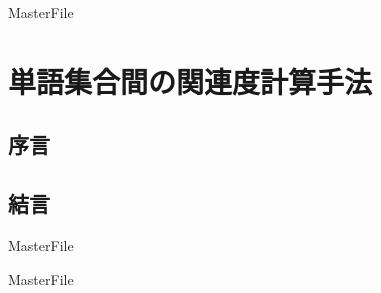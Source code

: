 \expandafter\ifx\csname MasterFile\endcsname\relax
	\def\SubFile{hoge}
	
	
	\setcounter{chapter}{3}
  \fi
  \cleardoublepage
\chapter{単語集合間の関連度計算手法}

\label{impl:chapter}

\section{序言}
\label{impl:introduction}

\section{結言}
\label{impl:conclusion}

 \expandafter\ifx\csname MasterFile\endcsname\relax
	\def\BibFile{hoge}
	
  \fi
  \expandafter\ifx\csname MasterFile\endcsname\relax
  
  \fi
